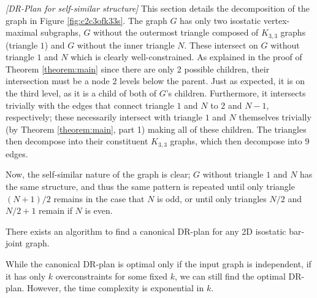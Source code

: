 \myexample
\textsl{[DR-Plan for self-similar structure]}
This section details the decomposition of the graph in Figure \ref{fig:c2c3ofk33s}. The graph $G$ has only two isostatic vertex-maximal subgraphs, $G$ without the outermost triangle composed of $K_{3,3}$ graphs (triangle $1$) and $G$ without the inner triangle $N$. These intersect on $G$ without triangle $1$ and $N$ which is clearly well-constrained. As explained in the proof of Theorem \ref{theorem:main} since there are only 2 possible children, their intersection must be a node 2 levels below the parent. Just as expected, it is on the third level, as it is a child of both of $G$'s children. Furthermore, it intersects trivially with the edges that connect triangle $1$ and $N$ to $2$ and $N-1$, respectively; these necessarily intersect with triangle $1$ and $N$ themselves trivially (by Theorem \ref{theorem:main}, part 1) making all of these children. The triangles then decompose into their constituent $K_{3,3}$ graphs, which then decompose into 9 edges.

Now, the self-similar nature of the graph is clear; $G$ without triangle $1$ and $N$ has the same structure, and thus the same pattern is repeated until only triangle $(N+1)/2$ remains in the case that $N$ is odd, or until only triangles $N/2$ and $N/2+1$ remain if $N$ is even.










\begin{theorem}\label{theorem:algo_complexity}
    There exists an \candrpcomplexityv algorithm to find a canonical DR-plan for any 2D isostatic bar-joint graph.
\end{theorem}

\begin{remark}
    While the canonical DR-plan is optimal only if the input graph is independent, if it has only $k$ overconstraints for some fixed $k$, we can still find the optimal DR-plan. However, the time complexity is exponential in $k$.
\end{remark}
